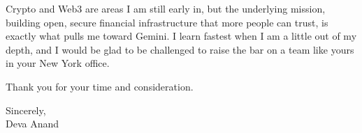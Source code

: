 \documentclass[letterpaper,11pt]{article}
\begin{document}
Crypto and Web3 are areas I am still early in, but the underlying mission, building open, secure financial infrastructure that more people can trust, is exactly what pulls me toward Gemini. I learn fastest when I am a little out of my depth, and I would be glad to be challenged to raise the bar on a team like yours in your New York office.

Thank you for your time and consideration.

\vspace{4pt}

Sincerely, \\
Deva Anand
\end{document}
